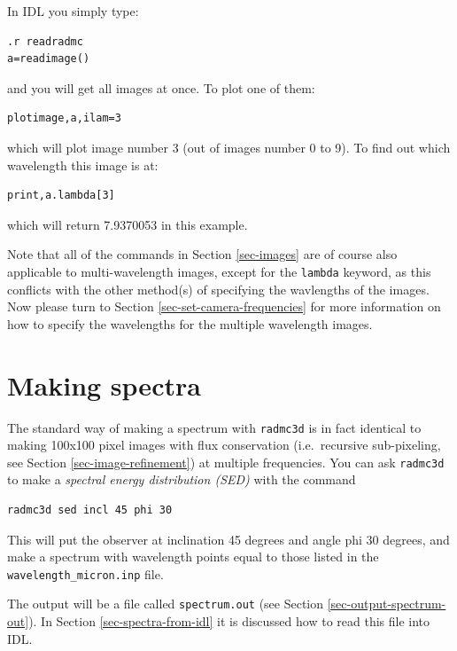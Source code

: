 \documentclass{report}
\newenvironment{asciibox}%
  {\begin{list}{}{%
    \setlength{\topsep}{0.5em}%
    \setlength{\parskip}{0em}%
    \setlength{\parsep}{0em}%
    \setlength{\itemsep}{0em}%
    \setlength{\rightmargin}{0em}%
    \setlength{\leftmargin}{3.0em}%
    \setlength{\labelsep}{1em}%
    \setlength{\labelwidth}{2em}%
  }\normalfont\footnotesize\item}
  {\end{list}}
\begin{document}
In IDL you simply type:
\begin{asciibox}\begin{verbatim}
.r readradmc
a=readimage()
\end{verbatim}\end{asciibox}
and you will get all images at once. To plot one of them:
\begin{asciibox}\begin{verbatim}
plotimage,a,ilam=3
\end{verbatim}\end{asciibox}
which will plot image number 3 (out of images number 0 to 9). To find out
which wavelength this image is at:
\begin{asciibox}\begin{verbatim}
print,a.lambda[3]
\end{verbatim}\end{asciibox}
which will return 7.9370053 in this example.

Note that all of the commands in Section \ref{sec-images} are of course also
applicable to multi-wavelength images, except for the {\small\tt lambda}
keyword, as this conflicts with the other method(s) of specifying the
wavlengths of the images. Now please turn to Section
\ref{sec-set-camera-frequencies} for more information on how to specify
the wavelengths for the multiple wavelength images.


\section{Making spectra}
\label{sec-making-spectra}
%
The standard way of making a spectrum with {\small\tt radmc3d} is in fact
identical to making 100x100 pixel images with flux conservation (i.e.\ recursive
sub-pixeling, see Section \ref{sec-image-refinement}) at multiple
frequencies. You can ask {\small\tt radmc3d} to make a {\em spectral energy
  distribution (SED)} with the command
\begin{asciibox}\begin{verbatim}
radmc3d sed incl 45 phi 30
\end{verbatim}\end{asciibox}
This will put the observer at inclination 45 degrees and angle phi 30
degrees, and make a spectrum with wavelength points equal to those listed
in the {\small\tt wavelength\_micron.inp} file. 

The output will be a file called {\small\tt spectrum.out} (see Section
\ref{sec-output-spectrum-out}). In Section \ref{sec-spectra-from-idl} it is
discussed how to read this file into IDL.
\end{document}
